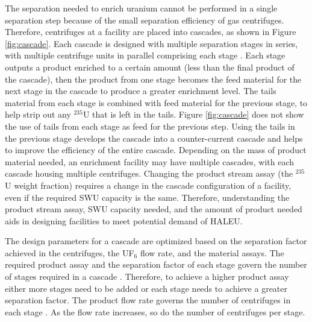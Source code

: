 The separation needed to enrich uranium cannot be performed 
in a single 
separation step because of the small separation efficiency of gas centrifuges. 
Therefore, centrifuges at a facility are placed into  
cascades, as shown in Figure \ref{fig:cascade}. Each cascade is designed with 
multiple separation stages in series, with multiple centrifuge units in 
parallel comprising each stage \cite{villani_uranium_1979}. Each stage 
outputs a product enriched to a certain amount (less than the final product 
of the cascade), then the product from one 
stage becomes the feed material for the next stage in the cascade to produce 
a greater enrichment level. The tails material from each 
stage is combined with feed material for the previous stage, to help strip 
out any $^{235}$U that is left in the tails. Figure 
\ref{fig:cascade} does not show the use of tails from each stage 
as feed for the previous step. Using the tails in the 
previous stage develops the cascade into a counter-current cascade 
\cite{villani_uranium_1979} and helps to improve the efficiency of the entire cascade. 
Depending on the mass of product material needed, an enrichment 
facility may have multiple cascades, with each cascade housing multiple 
centrifuges. 
Changing the product stream assay (the $^{235}$U weight fraction)
requires a change in the cascade configuration of 
a facility, even if the required \gls{SWU} capacity is the same. Therefore, 
understanding the product stream assay, \gls{SWU} capacity needed, and the 
amount of product needed aids in designing facilities to meet potential 
demand of \gls{HALEU}.



The design parameters for a cascade are optimized based on the separation 
factor 
achieved in the centrifuges, the UF$_6$ flow rate, and the material assays. 
The required product assay and the separation factor of each stage govern 
the number of stages required in a cascade \cite{whitaker_uranium_2019}. 
Therefore, to achieve a higher product assay either more stages 
need to be added or each stage needs to achieve a greater separation
factor. The product flow rate governs the number of centrifuges in 
each stage \cite{whitaker_uranium_2019}. As the flow rate increases, 
so do the number of centrifuges per stage. 


%
%
%
